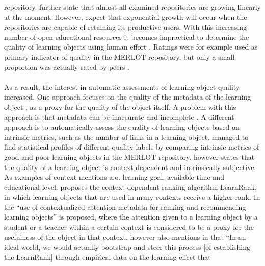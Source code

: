 repository. \citeauthor{Ochoa2009} further state that almost all examined
repositories are growing linearly at the moment. However,
\citeauthor{Ochoa2009} expect that exponential growth
will occur when the repositories are capable of retaining its productive users.
With this increasing number of open educational resources it becomes
impractical to determine the quality of learning objects using human effort
\citep{Cechinel2011}. Ratings were for example used as primary indicator of
quality in the MERLOT repository, but only a small proportion was actually
rated by peers \citep{Ochoa2006, Zemsky2004}.\\\\
\noindent
As a result, the interest in automatic assessments of learning object quality
increased. One approach focuses on the quality of the metadata of the learning
object \citep{Ochoa2009, Tani2013}, as a proxy for the quality of the object
itself.
A problem with this approach is that metadata can be inaccurate
\citep{Cechinel2009} and incomplete \citep{Sicilia2005}.
A different approach
is to automatically assess the quality of learning objects based on intrinsic
metrics, such as the number of links in a learning object.
\citeauthor{Cechinel2011} managed to find statistical profiles of different
quality labels by comparing intrinsic metrics of good and poor learning objects
in the MERLOT repository. \citet{Duval2006} however states that the quality of
a learning object is context-dependent and intrinsically subjective. As
examples of context \citeauthor{Duval2006} mentions a.o. learning goal,
available time and educational level. \citeauthor{Duval2006} proposes the
context-dependent ranking algorithm  LearnRank, in which learning objects that
are used in many contexts receive a higher rank. In \citep{Ochoa2006} the ``use
of contextualized attention metadata for ranking and recommending learning
objects'' is proposed, where the attention given to a learning object by a
student or a teacher within a certain context is considered to be a proxy for
the usefulness of the object in that context. \citeauthor{Duval2006} however
also mentions in \citep{Duval2006} that
``In an ideal world, we would actually bootstrap and steer this process [of
establishing the LearnRank] through empirical data on the learning effect that
